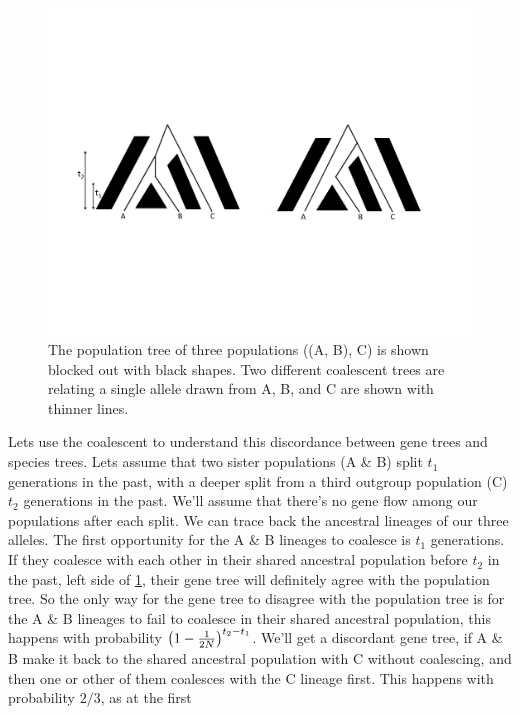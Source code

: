 \begin{figure}
\begin{center}
\includegraphics[width=\textwidth]{figures/Genetic_drift/ILS/ILS_coal_cartoon.pdf}
\end{center}
\caption{The population tree of three populations ((A, B), C) is shown
blocked out with black shapes. Two different coalescent trees are
relating a single allele drawn from A, B, and C are shown with thinner lines.} \label{fig:ILS_cartoon} 
\end{figure}
Lets use the coalescent to understand this discordance between gene
trees and species trees. Lets assume that two sister populations
(A \& B) split $t_1$ generations in the past, with a
deeper split from a third outgroup population (C) $t_2$ generations in the
past. We'll assume that there's no gene flow among our populations
after each split. We can trace back the ancestral lineages of our three alleles. The
first opportunity for the A \& B lineages to coalesce is $t_1$
generations. If they coalesce with each other in their shared
ancestral population before $t_2$ in the past, left side of
\ref{fig:ILS_cartoon}, their gene tree will
definitely agree with the population tree. So the only way for the gene
tree to disagree with the population tree is for the A \& B lineages
to fail to coalesce in their shared ancestral population, this happens
with probability $\left(1 - \nicefrac{1}{2N}\right)^{t_2-t_1}$. We'll
get a discordant gene tree, if A
\& B make it back to the shared ancestral population with C without
coalescing, and then one or other of them coalesces with the C
lineage first. This happens with probability $2/3$, as at the first
